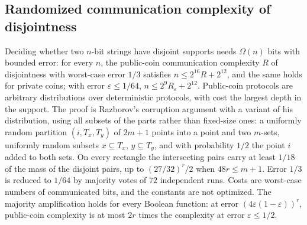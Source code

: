 \begin{result}
\subsection{Randomized communication complexity of disjointness}
Deciding whether two $n$-bit strings have disjoint supports needs $\Omega(n)$ bits with
bounded error: for every $n$, the public-coin communication complexity $R$ of
disjointness with worst-case error $1/3$ satisfies $n\le 2^{16}R+2^{12}$, and the same
holds for private coins; with error $\varepsilon\le 1/64$, $n\le 2^{9}R_\varepsilon+2^{12}$.
Public-coin protocols are arbitrary distributions over deterministic protocols, with cost
the largest depth in the support. The proof is Razborov's corruption argument with a
variant of his distribution, using all subsets of the parts rather than fixed-size ones: a
uniformly random partition $(i,T_x,T_y)$ of $2m+1$ points into a point and two
$m$-sets, uniformly random subsets $x\subseteq T_x$, $y\subseteq T_y$, and with
probability $1/2$ the point $i$ added to both sets. On every rectangle the intersecting
pairs carry at least $1/18$ of the mass of the disjoint pairs, up to $(27/32)^r/2$ when
$48r\le m+1$. Error $1/3$ is reduced to $1/64$ by majority votes of $72$ independent runs.
Costs are worst-case numbers of communicated bits, and the constants are not optimized.
\citep{KalyanasundaramSchnitger1992,Razborov1992,KushilevitzNisan1997}
The majority amplification holds for every Boolean function: at error $(4\varepsilon(1-\varepsilon))^r$,
public-coin complexity is at most $2r$ times the complexity at error $\varepsilon\le1/2$.
\end{result}

